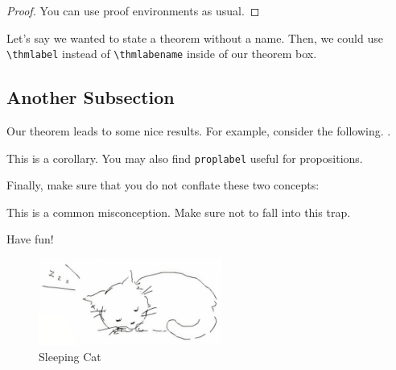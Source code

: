 \begin{proof}
You can use proof environments as usual. 
\end{proof}

Let's say we wanted to state a theorem without a name. Then, we could use \verb+\thmlabel+ instead of \verb+\thmlabename+ inside of our theorem box. 

\subsection{Another Subsection}

Our theorem leads to some nice results. For example, consider the following. .

\begin{theorem}
\corlabel

This is a corollary. You may also find \verb+proplabel+ useful for propositions. 
\end{theorem}

Finally, make sure that you do not conflate these two concepts:

\begin{misconception}
\mislabel

This is a common misconception. Make sure not to fall into this trap. 
\end{misconception}

Have fun!
\begin{figure}[h]
    \centering
    \includegraphics[width=6cm]{images/sleepingcat.png}
    \caption{Sleeping Cat}
\end{figure}

